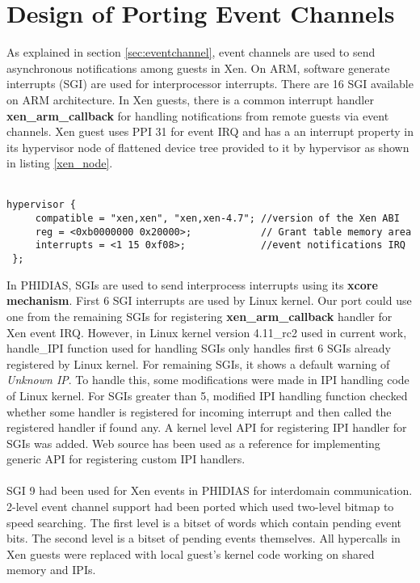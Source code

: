 \section{Design of Porting Event Channels\label{sec:eventstatic}}
As explained in section \ref{sec:eventchannel}, event channels are used to send asynchronous notifications among guests in Xen. On ARM, software generate interrupts (SGI) are used for interprocessor interrupts. There are 16 SGI available on ARM architecture. In Xen guests, there is a common interrupt handler \textbf{xen\_arm\_callback} for handling notifications from remote guests via event channels. Xen guest uses PPI 31 for event IRQ and has a an interrupt property in its hypervisor node of flattened device tree provided to it by hypervisor as shown in listing \ref{xen_node}.
\\
\\
\begin{lstlisting}[caption=Xen Hypervisor node in hi6220 flattened device tree, label={xen_node}]
 hypervisor {
     compatible = "xen,xen", "xen,xen-4.7"; //version of the Xen ABI 
     reg = <0xb0000000 0x20000>;            // Grant table memory area 
     interrupts = <1 15 0xf08>;             //event notifications IRQ
 };

\end{lstlisting}
In PHIDIAS, SGIs are used to send interprocess interrupts using its \textbf{xcore mechanism}. First 6 SGI interrupts are used by Linux kernel. Our port could use one from the remaining SGIs for registering \textbf{xen\_arm\_callback} handler for Xen event IRQ. However, in Linux kernel version 4.11\_rc2 used in current work, handle\_IPI function used for handling SGIs only handles first 6 SGIs already registered by Linux kernel. For remaining SGIs, it shows a default warning of \textit{Unknown IP}. To handle this, some modifications were made in IPI handling code of Linux kernel. For SGIs greater than 5, modified IPI handling function checked whether some handler is registered for incoming interrupt and then called the registered handler if found any. A kernel level API for registering IPI handler for SGIs was added. Web source \cite{smp} has been used as a reference for implementing generic API for registering custom IPI handlers.
\\
\\
SGI 9 had been used for Xen events in PHIDIAS for interdomain communication. 2-level event channel support had been ported which used two-level bitmap to speed searching. The first level is a bitset of words which contain pending event bits.  The second level is a bitset of pending events themselves. All hypercalls in Xen guests were replaced with local guest's kernel code working on shared memory and IPIs. 


